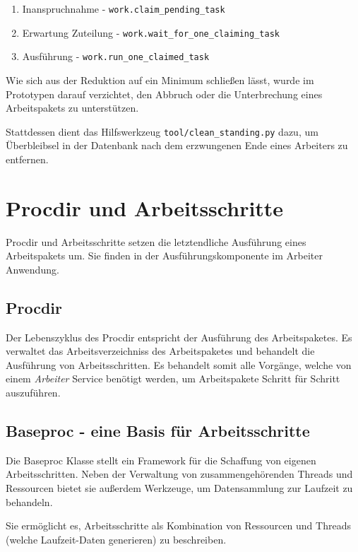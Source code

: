 \begin{enumerate}
    \item Inanspruchnahme - \verb|work.claim_pending_task|
    \item Erwartung Zuteilung - \verb|work.wait_for_one_claiming_task|
    \item Ausführung - \verb|work.run_one_claimed_task|
\end{enumerate}

Wie sich aus der Reduktion auf ein Minimum schließen lässt,
wurde im Prototypen darauf verzichtet, den Abbruch oder die Unterbrechung
eines Arbeitspakets zu unterstützen.

Stattdessen dient das Hilfswerkzeug \verb|tool/clean_standing.py| dazu,
um Überbleibsel in der Datenbank nach dem erzwungenen Ende
eines Arbeiters zu entfernen.



\section{Procdir und Arbeitsschritte}

Procdir und Arbeitsschritte setzen die letztendliche Ausführung eines Arbeitspakets um.
Sie finden in der Ausführungskomponente im Arbeiter Anwendung.


\subsection{Procdir}

Der Lebenszyklus des Procdir entspricht der Ausführung des Arbeitspaketes.
Es verwaltet das Arbeitsverzeichniss des Arbeitspaketes und behandelt die Ausführung von Arbeitsschritten.
Es behandelt somit alle Vorgänge, welche von einem \emph{Arbeiter} Service benötigt werden, um  Arbeitspakete Schritt für Schritt auszuführen.

\subsection{Baseproc - eine Basis für Arbeitsschritte}

Die Baseproc Klasse stellt ein Framework für die Schaffung von eigenen Arbeitsschritten.
Neben der Verwaltung von zusammengehörenden Threads und Ressourcen bietet sie außerdem Werkzeuge, um Datensammlung zur Laufzeit zu behandeln.

Sie ermöglicht es, Arbeitsschritte als Kombination von Ressourcen und Threads (welche Laufzeit-Daten generieren) zu beschreiben.


